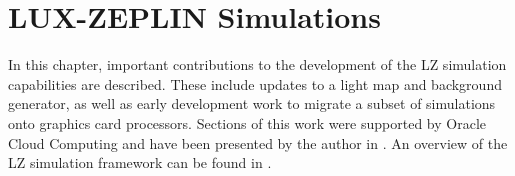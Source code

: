 \chapter{LUX-ZEPLIN Simulations}
\label{chap:lz_simulations}
\par
In this chapter, important contributions to the development of the LZ simulation capabilities are described.
These include updates to a light map and background generator, as well as early development work to migrate a subset of simulations onto graphics card processors.
Sections of this work were supported by Oracle Cloud Computing and have been presented by the author in \cite{se_poster_2018,se_poster_2019_summerschool,se_poster_2019_bristol,SEriksen_IoP_2021_talk_ref}.
An overview of the LZ simulation framework can be found in \cite{lz_simulations_ref}.





